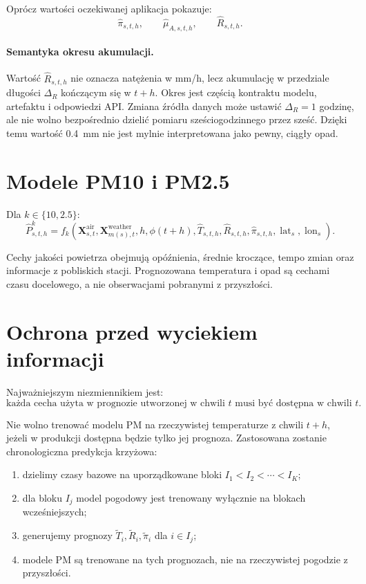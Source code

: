 \documentclass[11pt,a4paper,oneside]{article}
\newcommand{\X}{\mathbf{X}}
\begin{document}
Oprócz wartości oczekiwanej aplikacja pokazuje:
\[
  \widehat\pi_{s,t,h},
  \qquad
  \widehat\mu_{A,s,t,h},
  \qquad
  \widehat R_{s,t,h}.
\]

\paragraph{Semantyka okresu akumulacji.}
Wartość $\widehat R_{s,t,h}$ nie oznacza natężenia w mm/h, lecz akumulację
w przedziale długości $\Delta_R$ kończącym się w $t+h$. Okres jest częścią
kontraktu modelu, artefaktu i odpowiedzi API. Zmiana źródła danych może ustawić
$\Delta_R=1$ godzinę, ale nie wolno bezpośrednio dzielić pomiaru sześciogodzinnego
przez sześć.
Dzięki temu wartość \SI{0.4}{\milli\meter} nie jest mylnie interpretowana jako
pewny, ciągły opad.

\section{Modele PM10 i PM2.5}

Dla $k\in\{10,2.5\}$:
\begin{equation}
  \widehat P^{k}_{s,t,h}
  =
  f_k\!\left(
    \X^{\mathrm{air}}_{s,t},
    \X^{\mathrm{weather}}_{m(s),t},
    h,
    \phi(t+h),
    \widehat T_{s,t,h},
    \widehat R_{s,t,h},
    \widehat\pi_{s,t,h},
    \operatorname{lat}_s,
    \operatorname{lon}_s
  \right).
  \label{eq:pm-model}
\end{equation}

Cechy jakości powietrza obejmują opóźnienia, średnie kroczące, tempo zmian
oraz informacje z pobliskich stacji. Prognozowana temperatura i opad są
cechami czasu docelowego, a nie obserwacjami pobranymi z przyszłości.

\section{Ochrona przed wyciekiem informacji}

Najważniejszym niezmiennikiem jest:
\[
  \text{każda cecha użyta w prognozie utworzonej w chwili }t
  \text{ musi być dostępna w chwili }t.
\]

Nie wolno trenować modelu PM na rzeczywistej temperaturze z chwili $t+h$,
jeżeli w produkcji dostępna będzie tylko jej prognoza. Zastosowana zostanie
chronologiczna predykcja krzyżowa:

\begin{enumerate}
  \item dzielimy czasy bazowe na uporządkowane bloki
        $I_1<I_2<\cdots<I_K$;
  \item dla bloku $I_j$ model pogodowy jest trenowany wyłącznie na blokach
        wcześniejszych;
  \item generujemy prognozy
        $\widetilde T_i,\widetilde R_i,\widetilde\pi_i$ dla $i\in I_j$;
  \item modele PM są trenowane na tych prognozach, nie na rzeczywistej
        pogodzie z przyszłości.
\end{enumerate}
\end{document}
